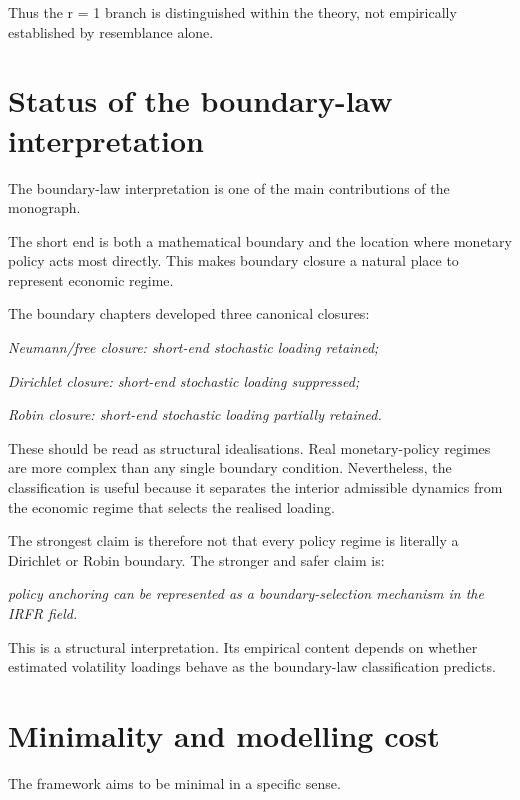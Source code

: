 \documentclass[11pt,oneside]{book}
\begin{document}
Thus the r = 1 branch is distinguished within the theory, not
empirically established by resemblance alone.

\section{Status of the boundary-law
interpretation}\label{status-of-the-boundary-law-interpretation}

The boundary-law interpretation is one of the main contributions of the
monograph.

The short end is both a mathematical boundary and the location where
monetary policy acts most directly. This makes boundary closure a
natural place to represent economic regime.

The boundary chapters developed three canonical closures:

\begin{center}\emph{Neumann/free closure: short-end stochastic loading retained;}\end{center}
\begin{center}\emph{Dirichlet closure: short-end stochastic loading suppressed;}\end{center}
\begin{center}\emph{Robin closure: short-end stochastic loading partially retained.}\end{center}
These should be read as structural idealisations. Real monetary-policy
regimes are more complex than any single boundary condition.
Nevertheless, the classification is useful because it separates the
interior admissible dynamics from the economic regime that selects the
realised loading.

The strongest claim is therefore not that every policy regime is
literally a Dirichlet or Robin boundary. The stronger and safer claim
is:

\emph{policy anchoring can be represented as a boundary-selection
mechanism in the IRFR field.}

This is a structural interpretation. Its empirical content depends on
whether estimated volatility loadings behave as the boundary-law
classification predicts.

\section{Minimality and modelling
cost}\label{minimality-and-modelling-cost}

The framework aims to be minimal in a specific sense.
\end{document}
